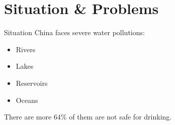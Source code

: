 \section{Situation \& Problems}

\begin{frame}{Situation}
	China faces severe water pollutions:
	\begin{itemize}
		\item Rivers
		\item Lakes
		\item Reservoirs
		\item Oceans
	\end{itemize}
	There are more $64\%$ of them are not safe for drinking.
\end{frame}